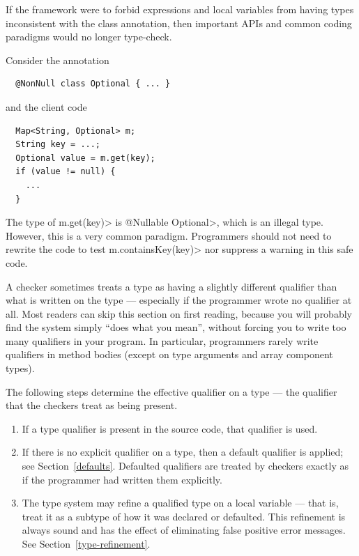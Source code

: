 If the framework were to forbid expressions and local variables from having types inconsistent with the class annotation,
then important APIs and common coding paradigms would no longer type-check.

Consider the annotation
\begin{Verbatim}
  @NonNull class Optional { ... }
\end{Verbatim}
and the client code

\begin{Verbatim}
  Map<String, Optional> m;
  String key = ...;
  Optional value = m.get(key);
  if (value != null) {
    ...
  }
\end{Verbatim}

The type of \<m.get(key)> is \<@Nullable Optional>, which is an illegal type.
However, this is a very common paradigm.  Programmers should not need to rewrite the code to test
\<m.containsKey(key)> nor suppress a warning in this safe code.



A checker sometimes treats a type as having a slightly different qualifier
than what is written on the type --- especially if the programmer wrote no
qualifier at all.
Most readers can skip this section on first reading, because you will
probably find the system simply ``does what you mean'', without forcing
you to write too many qualifiers in your program.
In particular, programmers rarely write qualifiers in method bodies (except on
type arguments and array component types).

The following steps determine the effective
qualifier on a type --- the qualifier that the checkers treat as being present.

\begin{enumerate}
\item
  If a type qualifier is present in the source code, that qualifier is used.

\item
  If there is no explicit qualifier on a type, then a default
  qualifier
  is applied; see Section~\ref{defaults}. Defaulted qualifiers are treated by checkers
  exactly as if the programmer had written them explicitly.

\item
  The type system may refine a qualified type on a local variable --- that
  is, treat it as a subtype of how it was declared or defaulted.  This
  refinement is always sound and has the effect of eliminating false
  positive error messages.  See Section~\ref{type-refinement}.

\end{enumerate}

